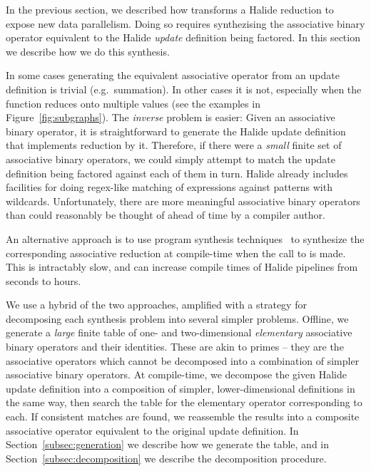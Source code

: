 In the previous section, we described how  transforms a Halide reduction to expose new data parallelism. Doing so requires synthezising the associative binary operator equivalent to the Halide \emph{update} definition being factored. In this section we describe how we do this synthesis.

In some cases generating the equivalent associative operator from an update definition is trivial (e.g.\ summation). In other cases it is not, especially when the function reduces onto multiple values (see the examples in Figure~\ref{fig:subgraphs}). The \emph{inverse} problem is easier: Given an associative binary operator, it is straightforward to generate the Halide update definition that implements reduction by it. Therefore, if there were a \emph{small} finite set of associative binary operators, we could simply attempt to match the update definition being factored against each of them in turn. Halide already includes facilities for doing regex-like matching of expressions against patterns with wildcards. Unfortunately, there are more meaningful associative binary operators than could reasonably be thought of ahead of time by a compiler author.

An alternative approach is to use program synthesis techniques~\cite{Solar-Lezama:2008:PSS:1714168, Torlak:2013:GSL:2509578.2509586} to synthesize the corresponding associative reduction at compile-time when the call to  is made. This is intractably slow, and can increase compile times of Halide pipelines from seconds to hours.

We use a hybrid of the two approaches, amplified with a strategy for decomposing each synthesis problem into several simpler problems. Offline, we generate a \emph{large} finite table of one- and two-dimensional \emph{elementary} associative binary operators and their identities. These are akin to primes -- they are the associative operators which cannot be decomposed into a combination of simpler associative binary operators. At compile-time, we decompose the given Halide update definition into a composition of simpler, lower-dimensional definitions in the same way, then search the table for the elementary operator corresponding to each. If consistent matches are found, we reassemble the results into a composite associative operator equivalent to the original update definition. In Section~\ref{subsec:generation} we describe how we generate the table, and in Section~\ref{subsec:decomposition} we describe the decomposition procedure.

